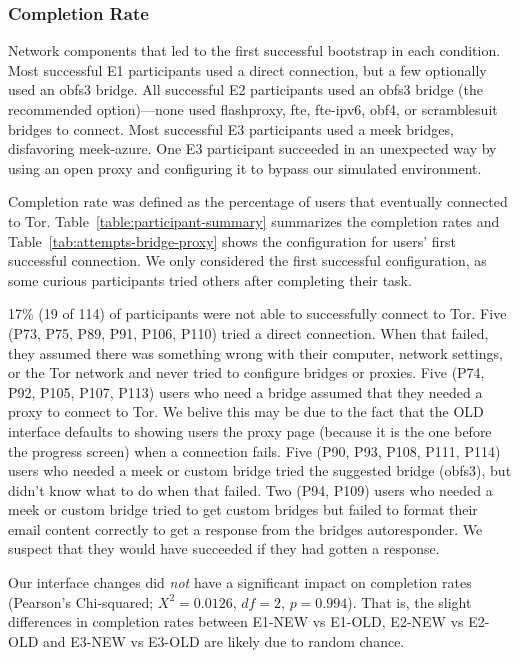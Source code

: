\documentclass[USenglish,oneside,twocolumn]{article}
\begin{document}
\subsubsection{Completion Rate} 

\begin{table}[t]
\centering

\caption{
Network components that led to the first successful bootstrap
in each condition.
Most successful E1 participants used a direct connection,
but a few optionally used an obfs3 bridge.
All successful E2 participants used 
an obfs3 bridge (the recommended option)---none used 
flashproxy, fte, fte-ipv6, obf4, or scramblesuit bridges to connect. 
Most successful E3 participants
used a meek bridges, disfavoring meek-azure.
One E3 participant succeeded in an unexpected way
by using an open proxy and configuring it to bypass our 
simulated environment.
}
\label{tab:attempts-bridge-proxy}
\end{table}

Completion rate was defined as the percentage of users that eventually connected to Tor. Table~\ref{table:participant-summary} summarizes the completion rates and Table~\ref{tab:attempts-bridge-proxy} shows the configuration for users' first successful connection. We only considered the first successful configuration, as some curious participants tried others after completing their task. 

17\% (19 of 114) of participants were not able to successfully connect to Tor. Five (P73, P75, P89, P91, P106, P110) tried a direct connection. When that failed, they assumed there was something wrong with their computer, network settings, or the Tor network and never tried to configure bridges or proxies. Five (P74, P92, P105, P107, P113) users who need a bridge assumed that they needed a proxy to connect to Tor. We belive this may be due to the fact that the OLD interface defaults to showing users the proxy page (because it is the one before the progress screen) when a connection fails. Five (P90, P93, P108, P111, P114) users who needed a meek or custom bridge tried the suggested bridge (obfs3), but didn't know what to do when that failed. Two (P94, P109) users who needed a meek or custom bridge tried to get custom bridges but failed to format their email content correctly to get a response from the bridges autoresponder. We suspect that they would have succeeded if they had gotten a response. 

Our interface changes did {\it not} have a significant impact on completion rates (Pearson's Chi-squared; $X^2 = 0.0126$, $df = 2$, $p = 0.994$). That is, the slight differences in completion rates between E1-NEW vs E1-OLD, E2-NEW vs E2-OLD and E3-NEW vs E3-OLD are likely due to random chance.
\end{document}
